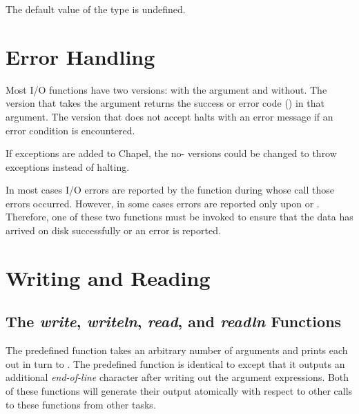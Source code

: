 The default value of the  type is undefined.


\section{Error Handling}
\label{IO_error_handling}

Most I/O functions have two versions: with the 
argument and without. The version that takes the  argument
returns the success or error code () in that argument.
The version that does not accept  halts with an error message
if an error condition is encountered.

\begin{future}
If exceptions are added to Chapel, the no- versions
could be changed to throw exceptions instead of halting.
\end{future}

In most cases I/O errors are reported by the function during whose
call those errors occurred. However, in some cases errors are
reported only upon  
or  .
Therefore, one of these two functions must be invoked to ensure
that the data has arrived on disk successfully or an error is reported.



\section{Writing and Reading}
\label{IO_writing_reading}


\subsection{The {\em write}, {\em writeln}, {\em read}, and {\em readln} 
Functions}

The predefined function  takes an arbitrary number of
arguments and prints each out in turn to .  The predefined
function  is identical to  except that it
outputs an additional {\em end-of-line} character after writing out
the argument expressions.  Both of these functions will generate their
output atomically with respect to other calls to these functions from
other tasks.

